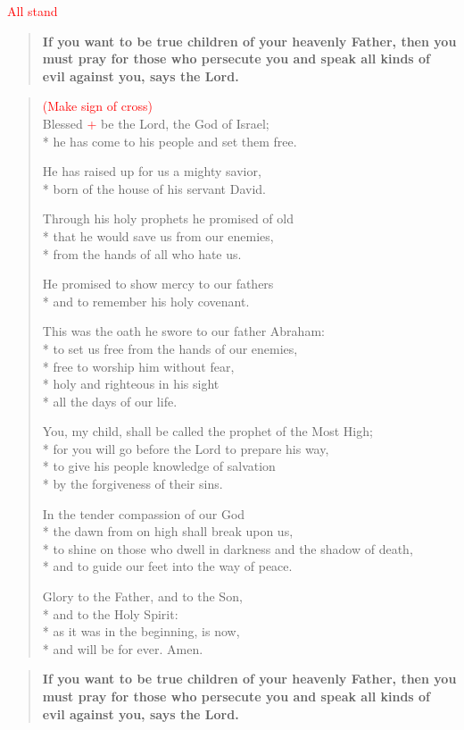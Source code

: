 \documentclass[letterpaper,14pt]{extarticle}
\newcommand{\side}[1]{\flagverse{\textcolor{red}{\textit{#1}}:}}
\newcommand{\rednote}[1]{\textcolor{red}{#1}}
\newlength{\oldindent}
\newcommand{\antiphon}[2]{
	\setlength{\oldindent}{\vindent}
	\setlength{\vindent}{0em}
	\begin{verse}
	\side{#1} \textbf{#2}
	\end{verse}
	\setlength{\vindent}{\oldindent}
}
\begin{document}
\rednote{All stand}
\antiphon{Leader}{If you want to be true children of your heavenly Father, then you must pray for those who persecute you and speak all kinds of evil against you, says the Lord.}
\begin{verse}
\rednote{(Make sign of cross)}\\
\side{All} Blessed \rednote{+} be the Lord, the God of Israel; \\*
he has come to his people and set them free.

He has raised up for us a mighty savior, \\*
born of the house of his servant David.

Through his holy prophets he promised of old \\*
  that he would save us from our enemies, \\*
  from the hands of all who hate us.

He promised to show mercy to our fathers \\*
and to remember his holy covenant.

This was the oath he swore to our father Abraham: \\*
to set us free from the hands of our enemies, \\*
free to worship him without fear, \\*
holy and righteous in his sight \\*
   all the days of our life.

You, my child, shall be called the prophet of the Most High; \\*
for you will go before the Lord to prepare his way, \\*
to give his people knowledge of salvation \\*
by the forgiveness of their sins.

In the tender compassion of our God \\*
the dawn from on high shall break upon us, \\*
to shine on those who dwell in darkness and the shadow of death, \\*
and to guide our feet into the way of peace.

Glory to the Father, and to the Son, \\*
and to the Holy Spirit: \\*
as it was in the beginning, is now, \\*
and will be for ever. Amen.
\end{verse}
\antiphon{All}{If you want to be true children of your heavenly Father, then you must pray for those who persecute you and speak all kinds of evil against you, says the Lord.}
\end{document}
